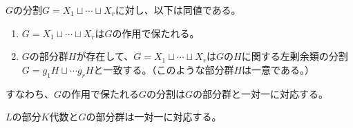 \begin{proposition}\label{group-decomp}
    $G$の分割$G=X_1\sqcup\cdots\sqcup X_r$に対し、以下は同値である。
    \begin{enumerate}
        \item $G=X_1\sqcup\cdots\sqcup X_r$は$G$の作用で保たれる。
        \item $G$の部分群$H$が存在して、$G=X_1\sqcup\cdots\sqcup X_r$は$G$の$H$に関する左剰余類の分割$G=g_1H\sqcup\cdots g_rH$と一致する。（このような部分群$H$は一意である。）
    \end{enumerate}
    すなわち、$G$の作用で保たれる$G$の分割は$G$の部分群と一対一に対応する。
\end{proposition}

\begin{theorem}\label{main}
    $L$の部分$K$代数と$G$の部分群は一対一に対応する。
\end{theorem}